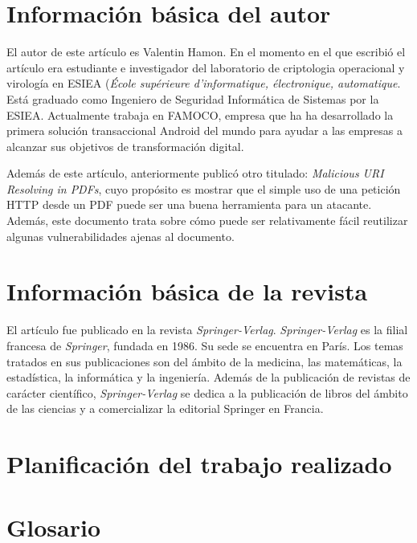 \documentclass[a4paper,11pt]{report}
\begin{document}




\chapter*{Información básica del autor}
El autor de este artículo es Valentin Hamon. En el momento en el que escribió el artículo era estudiante e investigador del laboratorio de criptologia operacional y virología en ESIEA (\emph{École supérieure d'informatique, électronique, automatique}. Está graduado como Ingeniero de Seguridad Informática de Sistemas por la ESIEA. Actualmente trabaja en FAMOCO, empresa que ha ha desarrollado la primera solución transaccional Android del mundo para ayudar a las empresas a alcanzar sus objetivos de transformación digital.

Además de este artículo, anteriormente publicó otro titulado: \emph{Malicious URI Resolving in PDFs}, cuyo propósito es mostrar que el simple uso de una petición HTTP desde un PDF puede ser una buena herramienta  para un atacante. Además, este documento trata sobre cómo puede ser relativamente fácil reutilizar algunas vulnerabilidades ajenas al documento. 

\chapter*{Información básica de la revista}

El artículo fue publicado en la revista \emph{Springer-Verlag}. \emph{Springer-Verlag} es la filial francesa de \emph{Springer}, fundada en 1986. Su sede se encuentra en París. Los temas tratados en sus publicaciones son del ámbito de la medicina, las matemáticas, la estadística, la informática y la ingeniería. Además de la publicación de revistas de carácter científico, \emph{Springer-Verlag} se dedica a la publicación de libros del ámbito de las ciencias y a comercializar la editorial Springer en Francia. 


\chapter*{Planificación del trabajo realizado}


\chapter*{Glosario}
\end{document}
